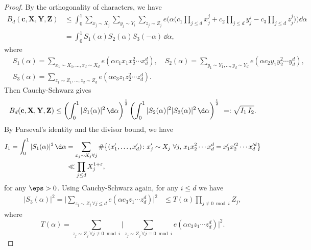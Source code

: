 \begin{proof}
  By the orthogonality of characters, we have
  \begin{align*}
  B_d(\mathbf{c},\mathbf{X},\mathbf{Y},\mathbf{Z}) &\leq \int_0^1 \sum_{x_j\sim X_j}\sum_{y_j\sim Y_i}\sum_{z_j\sim Z_j}e\Big(\alpha\Big(c_1\prod_{j\leq d}x_j^j+c_2\prod_{j\leq d}y_j^j-c_3\prod_{j\leq d}z_j^j\Big)\Big)\dd{\alpha} \nonumber\\
  &= \int_{0}^1 S_1(\alpha)S_2(\alpha)S_3(-\alpha)\, \dd \alpha,
  \end{align*}
  where
  \begin{align*}
  &S_1(\alpha)=\sum_{x_1\sim X_1,\ldots, x_d\sim X_d}e(\alpha c_1x_1x_2^2\cdots x_d^d),\quad S_2(\alpha)=\sum_{y_1\sim Y_1,\ldots, y_d\sim Y_d}e(\alpha c_2y_1y_2^2\cdots y_d^d),\\
  &S_3(\alpha)=\sum_{z_1\sim Z_1,\ldots, z_d\sim Z_d}e(\alpha c_3z_1z_2^2\cdots z_d^d).
  \end{align*}
  Then Cauchy-Schwarz gives
  \begin{align}\label{eq:Bc123}
  B_d(\mathbf{c},\mathbf{X},\mathbf{Y},\mathbf{Z}) \leq \left(\int_{0}^1|S_1(\alpha)|^2\, \d\alpha\right)^{\frac{1}{2}}\left(\int_{0}^1|S_2(\alpha)|^2|S_3(\alpha)|^2\, \d\alpha\right)^{\frac{1}{2}} \ =: \sqrt{I_1\,I_2}.
  \end{align}
  By Parseval's identity and the divisor bound, we have
  \begin{align}\label{eq:prop3.1I1}\begin{split}
  I_1 =\int_{0}^1|S_1(\alpha)|^2\, \d\alpha
  &= \sum_{x_j\sim X_j\forall j}\#\big\{(x_1',\ldots, x_d')\colon x_j'\sim X_j\,\, \forall j,\, x_1x_2^2\cdots x_d^d=x_1'x_2'^2\cdots x_d'^d \big\}\\
  & \ll \prod_{j\leq d} X_j^{1+\varepsilon},
  \end{split}
  \end{align}
  for any $\eps>0$.
  Using Cauchy-Schwarz again, for any $i\le d$ we have
  \begin{align*}
  |S_3(\alpha)|^2 = \bigg|\sum_{z_j\sim Z_j\,\forall j\leq d}e(\alpha c_3z_1\cdots z_d^d)\bigg|^2
  &\leq T(\alpha)\prod_{j\not \equiv 0\bmod i}Z_{j},
  \end{align*}
  where
  \[
  T(\alpha)=
  \sum_{z_j\sim Z_j\, \forall j\not \equiv 0\bmod i}\bigg|\sum_{z_j\sim Z_j\, \forall j\equiv 0\bmod i}e(\alpha c_3z_1\cdots z_d^d)\bigg|^2.
  \]


\end{proof}
